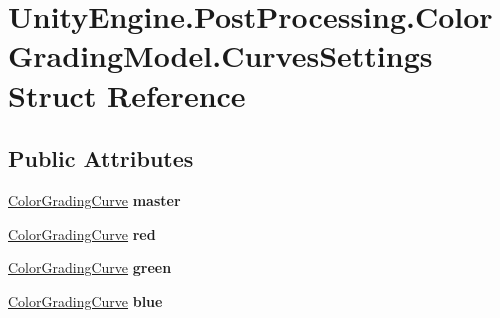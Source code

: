 \hypertarget{struct_unity_engine_1_1_post_processing_1_1_color_grading_model_1_1_curves_settings}{}\section{Unity\+Engine.\+Post\+Processing.\+Color\+Grading\+Model.\+Curves\+Settings Struct Reference}
\label{struct_unity_engine_1_1_post_processing_1_1_color_grading_model_1_1_curves_settings}
\subsection*{Public Attributes}
\begin{DoxyCompactItemize}
\item 
\mbox{\label{struct_unity_engine_1_1_post_processing_1_1_color_grading_model_1_1_curves_settings_a45b722d6b5f693200b00c3b5afa10c08}} 
\mbox{\hyperlink{class_unity_engine_1_1_post_processing_1_1_color_grading_curve}{Color\+Grading\+Curve}} {\bfseries master}
\item 
\mbox{\label{struct_unity_engine_1_1_post_processing_1_1_color_grading_model_1_1_curves_settings_a5eed66ba3015ad1f29f2ac50b7c24d97}} 
\mbox{\hyperlink{class_unity_engine_1_1_post_processing_1_1_color_grading_curve}{Color\+Grading\+Curve}} {\bfseries red}
\item 
\mbox{\label{struct_unity_engine_1_1_post_processing_1_1_color_grading_model_1_1_curves_settings_ae071b879ff13830f57d36808aa95b962}} 
\mbox{\hyperlink{class_unity_engine_1_1_post_processing_1_1_color_grading_curve}{Color\+Grading\+Curve}} {\bfseries green}
\item 
\mbox{\label{struct_unity_engine_1_1_post_processing_1_1_color_grading_model_1_1_curves_settings_ab803f67e4fdea7436c5dd6b41c21b86f}} 
\mbox{\hyperlink{class_unity_engine_1_1_post_processing_1_1_color_grading_curve}{Color\+Grading\+Curve}} {\bfseries blue}

\end{DoxyCompactItemize}
